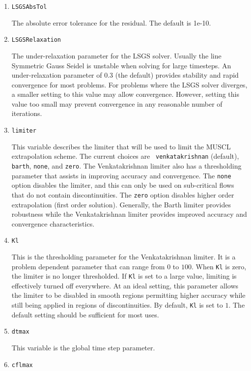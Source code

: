 \documentclass{article}
\begin{document}
\begin{enumerate}
\item {\tt LSGSAbsTol}

  The absolute error tolerance for the residual.  The default is 1e-10.

\item {\tt LSGSRelaxation}

  The under-relaxation parameter for the LSGS solver.  Usually the
  line Symmetric Gauss Seidel is unstable when solving for large
  timesteps.  An under-relaxation parameter of 0.3 (the default)
  provides stability and rapid convergence for most problems.  For
  problems where the LSGS solver diverges, a smaller setting to this
  value may allow convergence.  However, setting this value too small
  may prevent convergence in any reasonable number of iterations.

\item {\tt limiter }

  This variable describes the limiter that will be used to limit the
  MUSCL extrapolation scheme.  The current choices are {\tt
    venkatakrishnan} (default), {\tt barth}, {\tt none}, and {\tt zero}.  
  The Venkatakrishnan limiter also has a thresholding parameter
  that assists in improving accuracy and convergence.  The {\tt none}
  option disables the limiter, and this can only be used on
  sub-critical flows that do not contain discontinuities.  The
  {\tt zero} option disables higher order extrapolation (first order solution).
  Generally, the Barth limiter provides robustness while the Venkatakrishnan
  limiter provides improved accuracy and convergence characteristics.
  
\item {\tt Kl}
  
  This is the thresholding parameter for the Venkatakrishnan limiter.
  It is a problem dependent parameter that can range from $0$ to
  $100$.  When {\tt Kl} is zero, the limiter is no longer
  thresholded.  If {\tt Kl} is set to a large value, limiting is
  effectively turned off everywhere.  At an ideal setting, this
  parameter allows the limiter to be disabled in smooth regions
  permitting higher accuracy while still being applied in regions of
  discontinuities.  By default, {\tt Kl} is set to $1$.  The default
  setting should be sufficient for most uses.

\item {\tt dtmax}
  
  This variable is the global time step parameter.  

\item {\tt cflmax} 
  

\end{enumerate}
\end{document}
